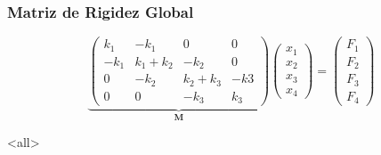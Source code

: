 \begin{frame}[label=FrameMatrizRigidez]
  \frametitle<presentation>{Matriz de Rigidez Global}

  \begin{equation}
    \underbrace{
      \begin{pmatrix}
	k_1  & -k_1     & 0    & 0 \\
	-k_1 & k_1 +k_2 & -k_2 & 0 \\
	0    & -k_2     & k_2 + k_3 & -k3\\
	0    &  0       & -k_3      & k_3
      \end{pmatrix}
    }_{\mathbf{M}}
    \begin{pmatrix}
      x_1\\
      x_2\\
      x_3\\
      x_4
    \end{pmatrix}
    =
    \begin{pmatrix}
      F_1\\
      F_2\\
      F_3\\
      F_4
    \end{pmatrix}
  \end{equation}

\end{frame}

\mode<all>
